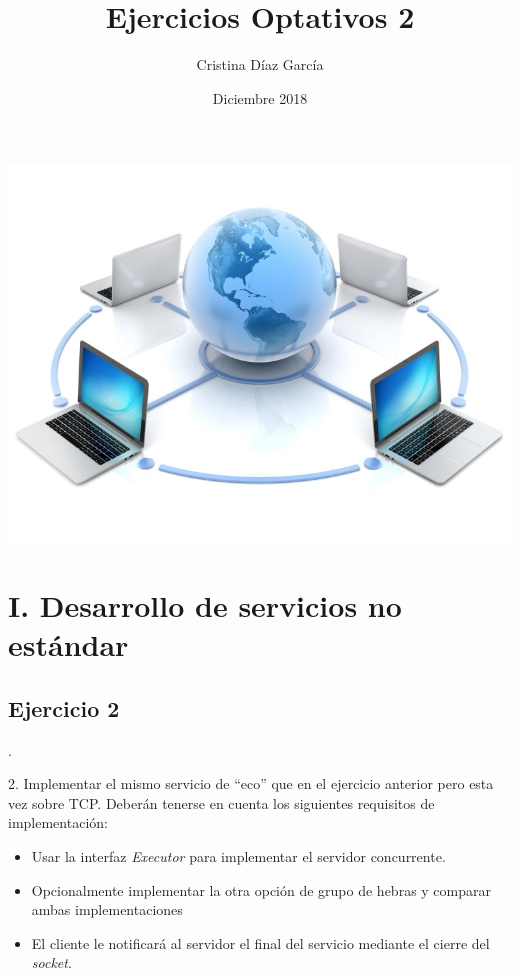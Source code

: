 \documentclass{article}
\title{Ejercicios Optativos 2}
\author{Cristina Díaz García}
\date{Diciembre 2018}
\begin{document}

\begin{titlingpage}
\maketitle

\begin{center}
\includegraphics[scale=0.4]{images/comunicaciones.png} 
\end{center}

\end{titlingpage}

\newpage

\tableofcontents

\newpage

\section{I. Desarrollo de servicios no estándar}


\subsection{Ejercicio 2}.

2. Implementar el mismo servicio de “eco” que en el ejercicio anterior pero esta vez sobre
TCP. Deberán tenerse en cuenta los siguientes requisitos de implementación:
\begin{itemize}
\item Usar la interfaz \textit{Executor} para implementar el servidor concurrente.
\item Opcionalmente implementar la otra opción de grupo de hebras y comparar ambas
implementaciones
\item El cliente le notificará al servidor el final del servicio mediante el cierre del \textit{socket}.
\end{itemize}
\end{document}
